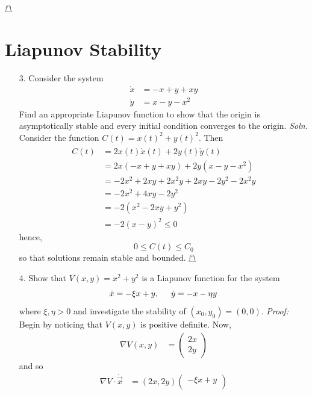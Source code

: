 \documentclass{article}
\begin{document}
\begin{itemize}
\begin{itemize}
    \end{itemize}
\end{itemize}
\hfill $\mathghost$
\pagebreak
\section*{Liapunov Stability}
\begin{itemize}
    \item[3.] Consider the system 
    \begin{align*}
        \dot{x} &= -x + y + xy\\
        \dot{y} &= x - y - x^2
    \end{align*}
    Find an appropriate Liapunov function to show that the origin is asymptotically stable and every initial condition converges to the origin.
    \textit{Soln.} Consider the function $C(t) = x(t)^2 + y(t)^2$. Then
    \begin{align*}
        \dot{C}(t) &= 2x(t)\dot{x}(t) + 2y(t)\dot{y}(t)\\
        &= 2x(-x + y + xy) + 2y(x - y - x^2)\\
        &= -2x^2 + 2xy + 2x^2y + 2xy - 2y^2 - 2x^2y\\
        &= -2x^2 + 4xy - 2y^2\\
        &= -2(x^2 - 2xy + y^2)\\
        &= -2(x - y)^2 \leq 0
    \end{align*}
    hence,
    \[0 \leq C(t) \leq C_0\]
    so that solutions remain stable and bounded. \hfill $\mathghost$
    \pagebreak
    \item[4.] Show that $V(x,y) = x^2 + y^2$ is a Liapunov function for the system
    \[\dot{x} = -\xi x + y, \hspace{0.5cm} \dot{y} = -x - \eta y\]
    where $\xi, \eta > 0$ and investigate the stability of $(x_0, y_0) = (0,0)$.
    \newline\newline
    \textit{Proof:} Begin by noticing that $V(x,y)$ is positive definite. Now,
    \begin{align*}
        \nabla V(x,y) &= \begin{pmatrix}
            2x\\
            2y
        \end{pmatrix}
    \end{align*}
    and so
    \begin{align*}
        \nabla V \cdot \dot{\vec{x}} &= (2x,2y)\begin{pmatrix}
            -\xi x + y\\

\end{pmatrix}
\end{align*}
\end{itemize}
\end{document}

